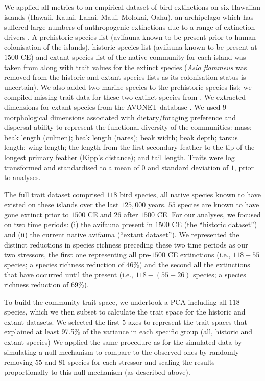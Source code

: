 \documentclass[12pt,letterpaper]{article}
\begin{document}
We applied all metrics to an empirical dataset of bird extinctions on six Hawaiian islands (Hawaii, Kauai, Lanai, Maui, Molokai, Oahu), an archipelago which has suffered large numbers of anthropogenic extinctions due to a range of extinction drivers \citep{Walther2022}.
A prehistoric species list (avifauna known to be present prior to human colonisation of the islands), historic species list (avifauna known to be present at $1500$ CE) and extant species list of the native community for each island was taken from \cite{matthews2023global} along with trait values for the extinct species (\textit{Asio flammeus} was removed from the historic and extant species lists as its colonisation status is uncertain).
We also added two marine species to the prehistoric species list; we compiled missing trait data for these two extinct species from \cite{sayol2021loss}.
We extracted dimensions for extant species from the AVONET database \citep{tobias2022avonet}.
We used $9$ morphological dimensions associated with dietary/foraging preference and dispersal ability \citep{pigot2020macroevolutionary,sheard2020ecological} to represent the functional diversity of the communities: mass; beak length (culmen); beak length (nares); beak width; beak depth; tarsus length; wing length; the length from the first secondary feather to the tip of the longest primary feather (Kipp's distance); and tail length.
Traits were log transformed and standardised to a mean of $0$ and standard deviation of $1$, prior to analyses.

The full trait dataset comprised $118$ bird species, all native species known to have existed on these islands over the last $125,000$ years.
$55$ species are known to have gone extinct prior to $1500$ CE and $26$ after $1500$ CE.
For our analyses, we focused on two time periods: (i) the avifauna present in $1500$ CE (the ``historic dataset'') and (ii) the current native avifauna (``extant dataset'').
We represented the distinct reductions in species richness preceding these two time periods as our two stressors, the first one representing all pre-$1500$ CE extinctions (i.e., $118-55$ species; a species richness reduction of 46\%) and the second all the extinctions that have occurred until the present (i.e., $118-(55+26)$ species; a species richness reduction of 69\%).

To build the community trait space, we undertook a PCA including all $118$ species, which we then subset to calculate the trait space for the historic and extant datasets.
We selected the first $5$ axes to represent the trait spaces that explained at least 97.5\% of the variance in each specific group (all, historic and extant species)
We applied the same procedure as for the simulated data by simulating a null mechanism to compare to the observed ones by randomly removing $55$ and $81$ species for each stressor and scaling the results proportionally to this null mechanism (as described above).
\end{document}
